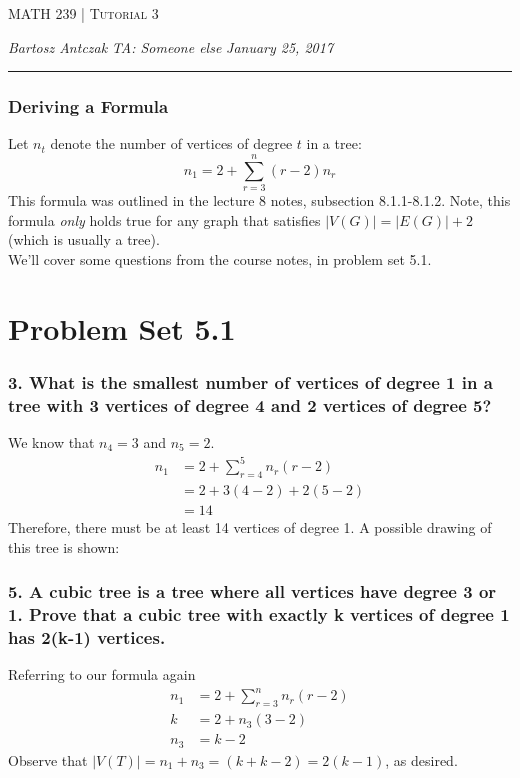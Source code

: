\documentclass{report}
\newcommand{\lectureNum}{3}
\newcommand{\curDate}{January 25, 2017}
\newcommand{\course}{MATH 239}
\newcommand{\instructor}{Someone else}
\begin{document}
\begin{center}
\begin{Large}
\textsc{\course{} | Tutorial \lectureNum{}}
\end{Large}
\end{center} 
\noindent \textit{Bartosz Antczak} \hfill
\textit{TA: \instructor{}} \hfill
\textit{\curDate{}}
\rule{\textwidth}{0.4pt}
\subsubsection{Deriving a Formula}
Let $n_t$ denote the number of vertices of degree $t$ in a tree:
$$n_1 = 2 + \sum_{r = 3}^n (r-2)n_r$$
This formula was outlined in the lecture 8 notes, subsection 8.1.1-8.1.2. Note, this formula \textit{only} holds true for any graph that satisfies $\vert V(G) \vert = \vert E(G) \vert  + 2$ (which is usually a tree).\\
We'll cover some questions from the course notes, in problem set 5.1.
\section{Problem Set 5.1}
\subsubsection{3. What is the smallest number of vertices of degree 1 in a tree with 3 vertices of degree 4 and 2 vertices of degree 5?}
We know that $n_4 = 3$ and $n_5 = 2$.
\begin{align}
n_1 &= 2 + \sum_{r = 4}^5 n_r(r-2) \\
&= 2 + 3(4-2) + 2(5-2)\\
&= 14
\end{align}
Therefore, there must be at least 14 vertices of degree 1. A possible drawing of this tree is shown:
\subsubsection{5. A cubic tree is a tree where all vertices have degree 3 or 1. Prove that a cubic tree with exactly k vertices of degree 1 has 2(k-1) vertices.}
Referring to our formula again
\begin{align}
n_1 &= 2 + \sum_{r = 3}^n n_r(r-2) \\
k &= 2 + n_3(3-2) \\
n_3 &= k-2
\end{align}
Observe that $\vert V(T) \vert = n_1 + n_3 = (k + k - 2) = 2(k-1)$, as desired.
\end{document}
